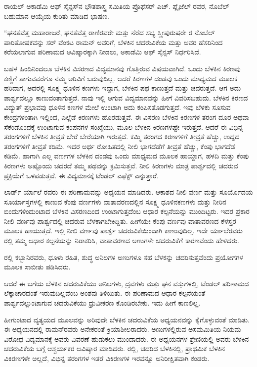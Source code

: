 ರಾಯಲ್ ಅಕಾಡೆಮಿ ಆಫ್ ಸೈನ್ಸಸ್‍ನ ಭೌತಶಾಸ್ತ್ರ ಸಮಿತಿಯ ಪ್ರೊಫೆಸರ್ ಎಚ್. ಪ್ಲೈಜೆಲ್ ರವರ, ನೊಬೆಲ್ ಬಹುಮಾನ ಆಯ್ಕೆಯ ಕುರಿತು ಮಾಡಿದ ಭಾಷಣ.

“ಘನತೆವೆತ್ತ ಮಹಾರಾಜರೆ, ಘನತೆವೆತ್ತ ರಾಣಿರವರೇ ಮತ್ತು ನೆರೆದ ಸಭ್ಯ ಸ್ತ್ರೀ\enginline{-}ಪುರುಷರೇ  ರ ನೊಬೆಲ್ ಪಾರಿತೋಷಕವನ್ನು ಸರ್ ವೆಂಕಟ ರಾಮನ್ ಅವರಿಗೆ, ಬೆಳಕಿನ ಚದರುವಿಕೆಯ ಮತ್ತು ಅವರ ಹೆಸರಿನಿಂದ ಕರೆಯಲಾಗುವ ಪರಿಣಾಮದ ಆವಿಷ್ಕಾರಕ್ಕಾಗಿ ನೀಡಲು, ಅಕಾಡೆಮಿ ಆಫ್ ಸೈನ್ಸಸ್ ನಿರ್ಧರಿಸಿದೆ.

ಬಹಳ ಹಿಂದಿನಿಂದಲೂ ಬೆಳಕಿನ ವಿಸರಣದ ವಿದ್ಯಮಾನವು ಗೊತ್ತಿರುವ ವಿಷಯವಾಗಿದೆ. ಒಂದು ಬೆಳಕಿನ ಕಿರಣವು ಕಣ್ಣಿಗೆ ತಾಗುವವರೆಗೂ ನಮ್ಮ ಅರಿವಿಗೆ ಬರುವುದಿಲ್ಲ. ಆದರೆ ಕಿರಣಗಳ ದಂಡವು ಒಂದು ಮಾಧ್ಯಮದ ಮೂಲಕ ಹರಿದಾಗ, ಅದರಲ್ಲಿ ಸೂಕ್ಷ್ಮ ಧೂಳಿನ ಕಣಗಳು ಇದ್ದಾಗ, ಬೆಳಕಿನ ಪಥ ಕಾಣುತ್ತದೆ ಮತ್ತು ಚದರುತ್ತದೆ. ಆಗ ಅದು ಪಾರ್ಶ್ವದಲ್ಲೂ ಕಾಣುವಂತಾಗುತ್ತದೆ. ನಾವು ಇಲ್ಲಿ ಆಗುವ ವಿದ್ಯಮಾನವನ್ನು ಹೀಗೆ ವಿವರಿಸಬಹುದು. ಬೆಳಕಿನ ಕಿರಣದ ವಿದ್ಯುತ್ ಪ್ರಭಾವವು ಧೂಳಿನ ಕಣಗಳ ಮೇಲೆ ಉಂಟಾಗಿ ಅದು ಕಂಪಿಸತೊಡಗುತ್ತದೆ. ಇವು ಬೆಳಕು ಸೂಸುವ ಕೇಂದ್ರಗಳಂತಾಗಿ ಇಲ್ಲಿಂದ, ಎಲ್ಲೆಡೆ ಕಿರಣಗಳು ಹೊರಡುತ್ತವೆ. ಈ ವಿಸರಣ ಬೆಳಕಿನ ಕಿರಣಗಳ ತರಂಗ ದೂರ ಅಥವಾ ಸೆಕೆಂಡೊಂದಕ್ಕೆ ಉಂಟಾಗುವ ಕಂಪನಗಳ ಸಂಖ್ಯೆಯು, ಮೂಲ ಬೆಳಕಿನ ಕಿರಣಗಳಷ್ಟೇ ಇರುತ್ತದೆ. ಆದರೆ ಈ ವಿಭಿನ್ನ ತರಂಗಗಳಿಗೆ ಬೆಳಕಿನ ತೀವ್ರತೆ ಬೇರೆ ಬೇರೆಯಾಗಿ ಇರುತ್ತದೆ. ಕಮ್ಮಿ ತರಂಗದ ಕಿರಣಗಳಿಗೆ ತೀವ್ರತೆ ಹೆಚ್ಚು, ಉದ್ದದ ತರಂಗಗಳಿಗೆ ತೀವ್ರತೆ ಕಡಿಮೆ. ಇದರ ಅರ್ಥ ರೋಹಿತದಲ್ಲಿ ನೀಲಿ ಭಾಗದೆಡೆಗೆ ತೀವ್ರತೆ ಹೆಚ್ಚು, ಕೆಂಪು ಭಾಗದೆಡೆ ಕಡಿಮೆ. ಹಾಗಾಗಿ ಎಲ್ಲ ವರ್ಣಗಳ ಬೆಳಕಿನ ದಂಡವು ಒಂದು ಮಾಧ್ಯಮದ ಮೂಲಕ ಹಾಯ್ದಾಗ, ಹಳದಿ ಮತ್ತು ಕೆಂಪು ಕಿರಣಗಳು ಅಷ್ಟೊಂದು ಚದರದೆ ತಮ್ಮ ಪಥವನ್ನು ಕ್ರಮಿಸುತ್ತವೆ. ನೀಲಿ ಕಿರಣಗಳು ಮಾತ್ರ ಪಾರ್ಶ್ವದಲ್ಲಿ ಚದರುವ ಪ್ರಕ್ರಿಯೆಗೆ ಒಳಪಡುತ್ತವೆ. ಈ ವಿದ್ಯಮಾನಕ್ಕೆ ಟೆಂಡಲ್ ಎಫೆಕ್ಟ್ ಎನ್ನುತ್ತಾರೆ.

ಲಾರ್ಡ್ ರ್ಯಾಲೆ ರವರು ಈ ಪರಿಣಾಮವನ್ನು ಅಧ್ಯಯನ ಮಾಡಿದರು. ಆಕಾಶದ ನೀಲಿ ವರ್ಣ ಮತ್ತು ಸೂರ್ಯೊದಯ ಸೂರ್ಯಾಸ್ತಗಳಲ್ಲಿ ಕಾಣುವ ಕೆಂಪು ವರ್ಣಗಳು ವಾತಾವರಣದಲ್ಲಿನ ಸೂಕ್ಷ್ಮ ಧೂಳಿನಕಣಗಳು ಮತ್ತು ನೀರಿನ ಬಿಂದುಗಳಿಂದುಂಟಾದ ಬೆಳಕಿನ ವಿಸರಣದಿಂದ ಉಂಟಾಗುತ್ತದೆಂಬ ಆಧಾರ ಕಲ್ಪನೆಯನ್ನು ಮುಂದಿಟ್ಟರು. ಇದರ ಪ್ರಕಾರ ನೀಲಿ ವರ್ಣವು ಪಾರ್ಶ್ವದಲ್ಲಿ ಚದರುವ ಬೆಳಕಾಗಬೇಕಿದ್ದಿತು. ಹೀಗೆಯೇ ಕೆಂಪು ವರ್ಣವು ವಾತಾವರಣದ ಕೆಳಸ್ತರ ಮೂಲಕ ಹಾಯುತ್ತದೆ. ಇಲ್ಲಿ ನೀಲಿ ವರ್ಣವು ಪಾರ್ಶ್ವ ಚದರುವಿಕೆಯಿಂದಾಗಿ ಕಾಣುವುದಿಲ್ಲ. ಇದೇ ರ್ಯಾಲೆರವರು ರಲ್ಲಿ ತಮ್ಮ ಆಧಾರ ಕಲ್ಪನೆಯನ್ನು ನಿರಾಕರಿಸಿ, ವಾತಾವರಣದ ಅಣುಗಳೇ ಚದರುವಿಕೆಗೆ ಕಾರಣವೆಂದು ಹೇಳಿದರು.

ರಲ್ಲಿ ಕಬ್ಬಾನಿರವರು, ಧೂಳು ರಹಿತ, ಶುದ್ಧ ಅನಿಲಗಳ ಅಣುಗಳೂ ಸಹ ಬೆಳಕನ್ನು ಚದರಿಸುತ್ತವೆಂದು ಪ್ರಯೋಗಗಳ ಮೂಲಕ ಸಾಬೀತು ಪಡಿಸಿದರು.

ಆದರೆ ಈ ಬಗೆಯ ಬೆಳಕಿನ ಚದರುವಿಕೆಯು ಅನಿಲಗಳು, ದ್ರವಗಳು ಮತ್ತು ಘನ ವಸ್ತುಗಳಲ್ಲಿ, ಟೆಂಡಲ್ ಪರಿಣಾಮದ ಲೆಕ್ಕಾಚಾರದಂತೆ ಇರುವುದಿಲ್ಲವೆಂಬ ಅಂಶವು ತಿಳಿಯಿತು. ಈ ಪರಿಣಾಮದ ಆಧಾರ ಕಲ್ಪನೆಯಂತೆ ಪಾರ್ಶ್ವದಲ್ಲುಂಟಾಗುವ ಚದರುವಿಕೆಯು ಧ್ರುವೀಕರಣ ಕೊಂಡಿರಬೇಕು. ಇದು ಹೀಗೆ ಕಾಣಲಿಲ್ಲ.

ಹೀಗುಂಟಾದ ವ್ಯತ್ಯಯದ ಮೂಲವನ್ನು ಅರಿವುದೇ ಬೆಳಕಿನ ಚದರುವಿಕೆಯ ಅಧ್ಯಯನವನ್ನು ಕೈಗೊಳ್ಳುವಂತೆ ಮಾಡಿತು. ಈ ಅಧ್ಯಯನದಲ್ಲಿ ರಾಮನ್‍ರವರು ಅನೇಕರಂತೆ ಕ್ರಿಯಾಶೀಲರಾದರು. ಅಣುಗಳಲ್ಲಿರುವ ಅಸಮಮಿತಿಯ ನಿಯಮ ವಿರೋಧ ವಿದ್ಯಮಾನಕ್ಕೆ ಅವರು ವಿವರಣೆ ಹುಡುಕಲು ಮುಂದಾದರು. ಈ ಅಧ್ಯಯನಗಳ ಶ್ರೇಣಿಯಲ್ಲಿ ಅವರು ಬೆಳಕಿನ ಚದರುವಿಕೆಯ ಬಗ್ಗೆ ಆಶ್ಚರ್ಯಕರ ಆವಿಷ್ಕಾರ ಮಾಡಿದರು. ರಲ್ಲಿ, ಚದರಿದ ಬೆಳಕಿನಲ್ಲಿ, ಪ್ರಾಥಮಿಕ ಬೆಳಕಿನ ವಿಕಿರಣಗಳೇ ಅಲ್ಲದೆ, ವಿಭಿನ್ನ ತರಂಗಗಳ ಇತರೆ ವಿಕಿರಣಗಳ ಇರವನ್ನೂ ಅನಿರೀಕ್ಷಿತವಾಗಿ ಕಂಡರು.

